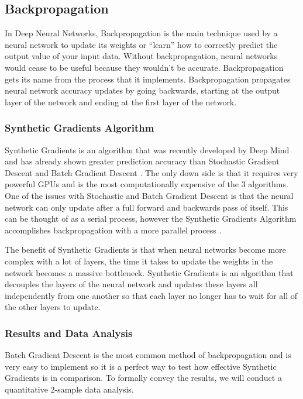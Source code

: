 \documentclass[draftclsnofoot, onecolumn, 10pt, compsoc]{IEEEtran}
\begin{document}
		\subsection{Backpropagation}
			In Deep Neural Networks, Backpropagation is the main technique used by a neural network to update its weights or “learn” how to correctly predict the output value of your input data. Without backpropagation, neural networks would cease to be useful because they wouldn’t be accurate. Backpropagation gets its name from the process that it implements. Backpropagation propagates neural network accuracy updates by going backwards, starting at the output layer of the network and ending at the first layer of the network.
				
			\subsubsection{Synthetic Gradients Algorithm}
				Synthetic Gradients is an algorithm that was recently developed by Deep Mind and has already shown greater prediction accuracy than Stochastic Gradient Descent and Batch Gradient Descent \cite{Raval}. The only down side is that it requires very powerful GPUs and is the most computationally expensive of the 3 algorithms. One of the issues with Stochastic and Batch Gradient Descent is that the neural network can only update after a full forward and backwards pass of itself. This can be thought of as a serial process, however the Synthetic Gradients Algorithm accomplishes backpropagation with a more parallel process \cite{Czarnecki}. 
				
				The benefit of Synthetic Gradients is that when neural networks become more complex with a lot of layers, the time it takes to update the weights in the network becomes a massive bottleneck. Synthetic Gradients is an algorithm that decouples the layers of the neural network and updates these layers all independently from one another so that each layer no longer has to wait for all of the other layers to update.
		
			\subsubsection{Results and Data Analysis}
				Batch Gradient Descent is the most common method of backpropagation and is very easy to implement so it is a perfect way to test how effective Synthetic Gradients is in comparison. To formally convey the results, we will conduct a quantitative 2-sample data analysis.
		
\end{document}
